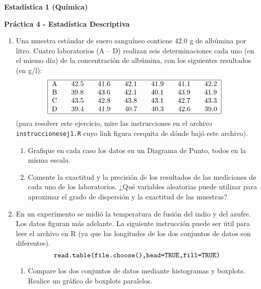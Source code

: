 \documentclass[a4paper, 11pt]{article}
\begin{document}
\begin{center}
\centerline{\bf Estadística 1 (Química)}%
\vspace{0.2cm}


\textbf{Práctica 4 - Estadística Descriptiva\vspace{-0.1in}}
\end{center}


\begin{enumerate}
\item Una muestra estándar de suero sanguíneo contiene $42.0$ g de
albúmina por litro. Cuatro laboratorios (A -- D) realizan seis
determinaciones cada uno (en el mismo día) de la concentración de
albúmina, con los siguientes resultados (en g/l):%
\[%
\begin{tabular}
[c]{|c|}\hline
A\qquad42.5\qquad41.6\qquad42.1\qquad41.9\qquad41.1\qquad42.2\\
B\qquad39.8\qquad43.6\qquad42.1\qquad40.1\qquad43.9\qquad41.9\\
C\qquad43.5\qquad42.8\qquad43.8\qquad43.1\qquad42.7\qquad43.3\\
D\qquad39.4\qquad41.9\qquad40.7\qquad40.3\qquad42.6\qquad39.0\\\hline
\end{tabular}
\ \
\]
(para resolver este ejercicio, mire las instrucciones en el archivo
\texttt{instruccionesej1.R} cuyo link figura cerquita de dónde bajó
este archivo).


\begin{enumerate}
\item Grafique en cada caso los datos en un Diagrama de Punto, todos en la
misma escala.


\item Comente la exactitud y la precisión de los resultados de las mediciones de cada uno de los laboratorios. ¿Qué variables aleatorias puede utilizar para aproximar el grado de dispersión y la exactitud de las muestras?
\end{enumerate}


\item En un experimento se midió la temperatura de fusión del
indio y del azufre. Los datos figuran más adelante. La siguiente
instrucción puede ser útil para leer el archivo en R (ya que las
longitudes de los dos conjuntos de datos son diferentes).%
\[
\text{\texttt{read.table(file.choose(),head=TRUE,fill=TRUE)}}%
\]

\begin{enumerate}
\item \label{2a} Compare los dos conjuntos de datos mediante histogramas y boxplots.
Realice un gráfico de boxplots paralelos.



\end{enumerate}
\end{enumerate}
\end{document}

